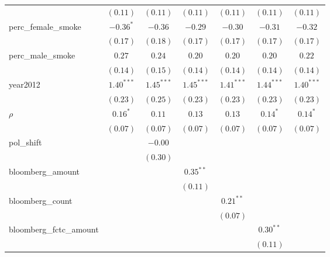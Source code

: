 \begin{table}[!h]
\begin{center}
\begin{tabular}{l c c c c c c }
                        & $(0.11)$     & $(0.11)$     & $(0.11)$     & $(0.11)$     & $(0.11)$     & $(0.11)$     \\
perc\_female\_smoke     & $-0.36^{*}$  & $-0.36$      & $-0.29$      & $-0.30$      & $-0.31$      & $-0.32$      \\
                        & $(0.17)$     & $(0.18)$     & $(0.17)$     & $(0.17)$     & $(0.17)$     & $(0.17)$     \\
perc\_male\_smoke       & $0.27$       & $0.24$       & $0.20$       & $0.20$       & $0.20$       & $0.22$       \\
                        & $(0.14)$     & $(0.15)$     & $(0.14)$     & $(0.14)$     & $(0.14)$     & $(0.14)$     \\
year2012                & $1.40^{***}$ & $1.45^{***}$ & $1.45^{***}$ & $1.41^{***}$ & $1.44^{***}$ & $1.40^{***}$ \\
                        & $(0.23)$     & $(0.25)$     & $(0.23)$     & $(0.23)$     & $(0.23)$     & $(0.23)$     \\
$\rho$                  & $0.16^{*}$   & $0.11$       & $0.13$       & $0.13$       & $0.14^{*}$   & $0.14^{*}$   \\
                        & $(0.07)$     & $(0.07)$     & $(0.07)$     & $(0.07)$     & $(0.07)$     & $(0.07)$     \\
pol\_shift              &              & $-0.00$      &              &              &              &              \\
                        &              & $(0.30)$     &              &              &              &              \\
bloomberg\_amount       &              &              & $0.35^{**}$  &              &              &              \\
                        &              &              & $(0.11)$     &              &              &              \\
bloomberg\_count        &              &              &              & $0.21^{**}$  &              &              \\
                        &              &              &              & $(0.07)$     &              &              \\
bloomberg\_fctc\_amount &              &              &              &              & $0.30^{**}$  &              \\
                        &              &              &              &              & $(0.11)$     &              \\

\end{tabular}
\end{center}
\end{table}
